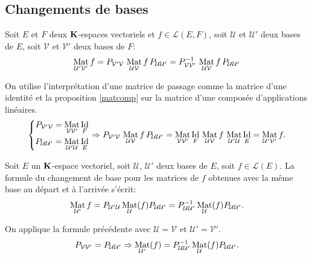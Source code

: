 \subsection{Changements de bases}
\begin{propn} \label{chgtbase}
 Soit $E$ et $F$ deux $\mathbf{K}$-espaces vectoriels et $f\in\mathcal L(E,F)$, soit $\mathcal U$ et $\mathcal U'$ deux bases de $E$, soit $\mathcal V$ et $\mathcal V'$ deux bases de $F$: 
\begin{displaymath}
 \mathop{\mathrm{Mat}}_{\mathcal U' \mathcal V'}f 
= P_{\mathcal V' \mathcal V} \, \mathop{\mathrm{Mat}}_{\mathcal U \mathcal V}f \, P_{\mathcal U \mathcal U'}
= P_{\mathcal V \mathcal V'}^{-1} \, \mathop{\mathrm{Mat}}_{\mathcal U \mathcal V}f \, P_{\mathcal U \mathcal U'}
\end{displaymath}
\end{propn}
\begin{demo}
On utilise l'interprétation d'une matrice de passage comme la matrice d'une identité et la proposition \ref{matcomp} sur la matrice d'une composée d'applications linéaires.
\begin{displaymath}
\left\lbrace 
\begin{aligned}
P_{\mathcal V' \mathcal V} &= \mathop{\mathrm{Mat}}_{\mathcal V \mathcal V'}\mathop{\mathrm{Id}}_F\\ 
P_{\mathcal U \mathcal U'} &= \mathop{\mathrm{Mat}}_{\mathcal U' \mathcal U}\mathop{\mathrm{Id}}_E
\end{aligned}
\right. \Rightarrow 
P_{\mathcal V' \mathcal V} \, \mathop{\mathrm{Mat}}_{\mathcal U \mathcal V}f \, P_{\mathcal U \mathcal U'}
= \mathop{\mathrm{Mat}}_{\mathcal V \mathcal V'}\mathop{\mathrm{Id}}_F \, \mathop{\mathrm{Mat}}_{\mathcal U \mathcal V}f \, \mathop{\mathrm{Mat}}_{\mathcal U' \mathcal U}\mathop{\mathrm{Id}}_E = \mathop{\mathrm{Mat}}_{\mathcal U' \mathcal V'}f.
\end{displaymath}
\end{demo}

\begin{propn}
 Soit $E$ un $\mathbf{K}$-espace vectoriel, soit $\mathcal U$, $\mathcal{U}'$ deux bases de $E$, soit $f\in\mathcal L(E)$. La formule du changement de base pour les matrices de $f$ obtenues avec la même base au départ et à l'arrivée s'écrit:
\begin{displaymath}
 \mathop{\mathrm{Mat}}_{\mathcal{U}'} f = P_{\mathcal{U}' \mathcal U} \mathop{\mathrm{Mat}}_{\mathcal U}( f) P_{\mathcal U \mathcal{U}'}
= P_{\mathcal U \mathcal{U}'}^{-1}\mathop{\mathrm{Mat}}_{\mathcal U}( f) P_{\mathcal U \mathcal{U}'}.
\end{displaymath}
\end{propn}
\begin{demo}
 On applique la formule précédente avec $\mathcal{U} = \mathcal{V}$ et $\mathcal{U}' = \mathcal{V}'$.
\[
 P_{\mathcal{V}\mathcal{V}'} = P_{\mathcal{U}\mathcal{U}'} 
 \Rightarrow 
 \mathop{\mathrm{Mat}}_{\mathcal{U}'}(f) = P_{\mathcal U \mathcal{U}'}^{-1}\mathop{\mathrm{Mat}}_{\mathcal U}( f) P_{\mathcal U \mathcal{U}'}.
\]
\end{demo}


